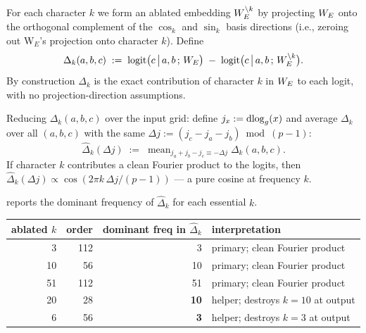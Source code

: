 For each character $k$ we form an ablated embedding $W_E^{\setminus k}$ by
projecting $W_E$ onto the orthogonal complement of the $\cos_k$ and $\sin_k$
basis directions (i.e., zeroing out W$_E$'s projection onto character $k$).
Define
\begin{equation}
  \Delta_k(a, b, c)
  \;:=\; \mathrm{logit}\bigl(c\,\big|\,a, b\,;\, W_E\bigr)
  \;-\; \mathrm{logit}\bigl(c\,\big|\,a, b\,;\, W_E^{\setminus k}\bigr).
  \label{eq:delta-k-def}
\end{equation}
By construction $\Delta_k$ is the exact contribution of character $k$ in
$W_E$ to each logit, with no projection-direction assumptions.

Reducing $\Delta_k(a, b, c)$ over the input grid: define
$j_x := \operatorname{dlog}_g(x)$ and average $\Delta_k$ over all $(a, b, c)$ with the
same $\Delta j := (j_c - j_a - j_b) \bmod (p-1)$:
\begin{equation}
  \widehat{\Delta}_k(\Delta j)
  \;:=\; \mathop{\mathrm{mean}}_{j_a + j_b - j_c \equiv -\Delta j}
            \Delta_k(a, b, c).
  \label{eq:delta-k-reduction}
\end{equation}
If character $k$ contributes a clean Fourier product to the logits, then
$\widehat{\Delta}_k(\Delta j) \propto \cos(2\pi k \,\Delta j / (p - 1))$
--- a pure cosine at frequency $k$.

 reports the dominant frequency of
$\widehat{\Delta}_k$ for each essential $k$.

\begin{center}
\begin{tabular}{r|r|r|l}
  ablated $k$ & order & dominant freq in $\widehat{\Delta}_k$ & interpretation \\
  \hline
  3   & 112 & 3   & primary; clean Fourier product \\
  10  & 56  & 10  & primary; clean Fourier product \\
  51  & 112 & 51  & primary; clean Fourier product \\
  20  & 28  & \textbf{10} & helper; destroys $k = 10$ at output \\
  6   & 56  & \textbf{3}  & helper; destroys $k = 3$ at output \\
\end{tabular}
\label{tab:harmonic-ablation-spectrum}
\end{center}

